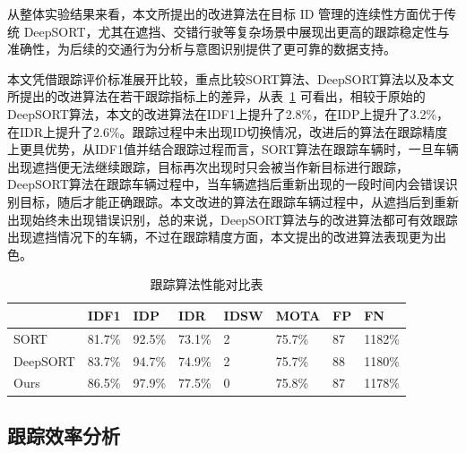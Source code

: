 从整体实验结果来看，本文所提出的改进算法在目标 ID 管理的连续性方面优于传统 DeepSORT，尤其在遮挡、交错行驶等复杂场景中展现出更高的跟踪稳定性与准确性，为后续的交通行为分析与意图识别提供了更可靠的数据支持。


本文凭借跟踪评价标准展开比较，重点比较SORT算法、DeepSORT算法以及本文所提出的改进算法在若干跟踪指标上的差异，从表~\ref{tab:performance} 可看出，相较于原始的DeepSORT算法，本文的改进算法在IDF1上提升了2.8\%，在IDP上提升了3.2\%，在IDR上提升了2.6\%。跟踪过程中未出现ID切换情况，改进后的算法在跟踪精度上更具优势，从IDF1值并结合跟踪过程而言，SORT算法在跟踪车辆时，一旦车辆出现遮挡便无法继续跟踪，目标再次出现时只会被当作新目标进行跟踪，DeepSORT算法在跟踪车辆过程中，当车辆遮挡后重新出现的一段时间内会错误识别目标，随后才能正确跟踪。本文改进的算法在跟踪车辆过程中，从遮挡后到重新出现始终未出现错误识别，总的来说，DeepSORT算法与的改进算法都可有效跟踪出现遮挡情况下的车辆，不过在跟踪精度方面，本文提出的改进算法表现更为出色。
\begin{table}[H]
	\caption{跟踪算法性能对比表}
	\label{tab:performance}
	\centering
	\begin{tabular}{llllllll}
		\toprule
		  & IDF1\uparrow & IDP\uparrow & IDR\uparrow & IDSW\downarrow & MOTA\uparrow & FP\downarrow & FN\downarrow \\
		\midrule
		SORT & 81.7\% & 92.5\% & 73.1\% & 2 & 75.7\% & 87 & 1182\% \\
		DeepSORT & 83.7\% & 94.7\% & 74.9\% & 2 & 75.7\% & 88 & 1180\% \\
		Ours & 86.5\% & 97.9\% & 77.5\% & 0 & 75.8\% & 87 & 1178\% \\
		\bottomrule
	\end{tabular}
\end{table}

\subsection{跟踪效率分析}

